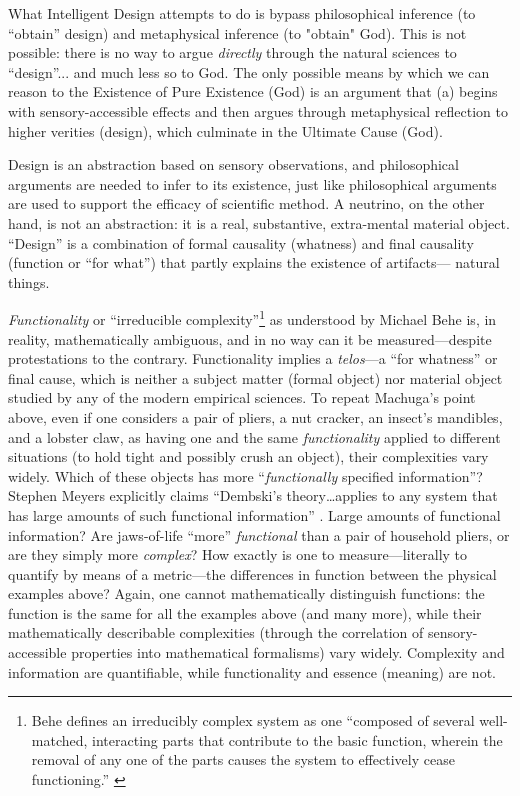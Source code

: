 What Intelligent Design attempts to do is bypass philosophical inference (to ``obtain'' design) and metaphysical inference (to "obtain" God). This is not possible: there is no way to argue \textit{directly} through the natural sciences to ``design''... and much less so to God. The only possible means by which we can reason to the Existence of Pure Existence (God) is an argument that (a) begins with sensory-accessible effects and then argues through metaphysical reflection to higher verities (design), which culminate in the Ultimate Cause (God).

Design is an abstraction based on sensory observations, and philosophical arguments are needed to infer to its existence, just like philosophical arguments are used to support the efficacy of scientific method. A neutrino, on the other hand, is not an abstraction: it is a real, substantive, extra-mental material object. ``Design'' is a combination of formal causality (whatness) and final causality (function or ``for what'') that partly explains the existence of artifacts--- natural things.

\textit{Functionality} or ``irreducible complexity''\footnote{Behe defines an irreducibly complex system as one “composed of several well-matched, interacting parts that contribute to the basic function, wherein the removal of any one of the parts causes the system to effectively cease functioning.” \citep[][p.~39]{behe2006}} as understood by Michael Behe is, in reality, mathematically ambiguous, and in no way can it be measured---despite protestations to the contrary. Functionality implies a \textit{telos}---a “for whatness” or final cause, which is neither a subject matter (formal object) nor material object studied by any of the modern empirical sciences.  To repeat Machuga's point above, even if one considers a pair of pliers, a nut cracker, an insect's mandibles, and a lobster claw, as having one and the same \textit{functionality} applied to different situations (to hold tight and possibly crush an object), their complexities vary widely. Which of these objects has more ``\textit{functionally} specified information''? Stephen Meyers explicitly claims ``Dembski's theory\ldots applies to any system that has large amounts of such functional information'' \cite[p.~372]{sigcell}. Large amounts of functional information? Are jaws-of-life ``more'' \textit{functional} than a pair of household pliers, or are they simply more \textit{complex}?  How exactly is one to measure---literally to quantify by means of a metric---the differences in function between the physical examples above? Again, one cannot mathematically distinguish functions: the function is the same for all the examples above (and many more), while their mathematically describable complexities (through the correlation of sensory-accessible properties into mathematical formalisms) vary widely.  Complexity and information are quantifiable, while functionality and essence (meaning) are not.

